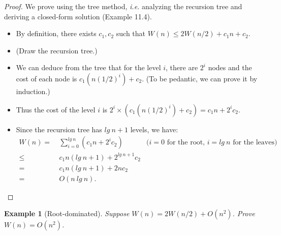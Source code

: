 \documentclass[11pt,a4paper,oneside,microtype,chapter,nokorean]{oblivoir}
\newtheorem{example}{Example}
\begin{document}
\begin{proof}
  We prove using the tree method, \emph{i.e.} analyzing the recursion tree and deriving a
  closed-form solution (Example 11.4).

  \begin{itemize}
  \item By definition, there exists $c_1,c_2$ such that $W(n) \le 2W(n/2) + c_1 n + c_2.$
  \item (Draw the recursion tree.)
  \item We can deduce from the tree that for the level $i$, there are $2^i$ nodes and the cost of
    each node is $c_1 (n (1/2)^i) + c_2$.  (To be pedantic, we can prove it by induction.)
  \item Thus the cost of the level $i$ is $2^i \times (c_1 (n (1/2)^i) + c_2) = c_1 n + 2^i c_2$.

  \item Since the recursion tree has $lg~n + 1$ levels, we have:
    \begin{align*}
      W(n)
      = &~ \sum_{i=0}^{lg~n} (c_1 n + 2^i c_2) & \mbox{($i=0$ for the root, $i=lg~n$ for the
                                                 leaves)} \\
      \le &~ c_1 n (lg~n + 1) + 2^{lg~n + 1} c_2 \\
      = &~ c_1 n (lg~n + 1) + 2 n c_2 \\
      = &~ O(n~lg~n).
    \end{align*}
  \end{itemize}
\end{proof}


\begin{example}[Root-dominated] Suppose $W(n) = 2W(n/2) + O(n^2)$.  Prove $W(n) = O(n^2)$.
\end{example}
\end{document}
